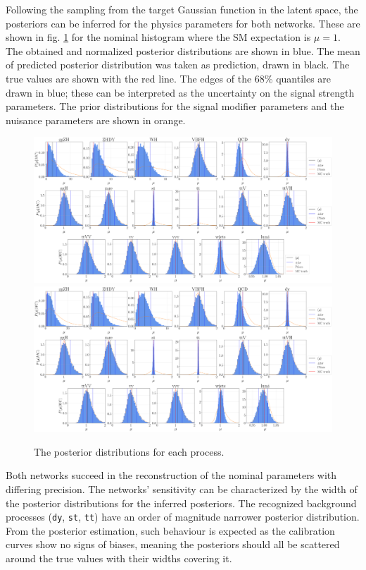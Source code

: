 
Following the sampling from the target Gaussian function in the latent space, the posteriors can be inferred for the physics parameters for both networks. These are shown in fig. \ref{fig:posteriors} for the nominal histogram where the SM expectation is $\mu=1$. The obtained and normalized posterior distributions are shown in blue. The mean of predicted posterior distribution was taken as prediction, drawn in black. The true values are shown with the red line. The edges of the 68\% quantiles are drawn in blue; these can be interpreted as the uncertainty on the signal strength parameters. The prior distributions for the signal modifier parameters and the nuisance parameters are shown in orange.

\begin{figure}[h!]
	\centering
	\includegraphics[width=\linewidth]{figures/inference/finalNoSummarye11000_posteriors}
	\includegraphics[width=\linewidth]{figures/inference/finalSummary1Layer11000e300NodesCdim100_posteriors}
	\caption{The posterior distributions for each process.}
	\label{fig:posteriors}
\end{figure}

Both networks succeed in the reconstruction of the nominal parameters with differing precision. The networks' sensitivity can be characterized by the width of the posterior distributions for the inferred posteriors. The recognized background processes (\texttt{dy}, \texttt{st}, \texttt{tt}) have an order of magnitude narrower posterior distribution. From the posterior estimation, such behaviour is expected as the calibration curves show no signs of biases, meaning the posteriors should all be scattered around the true values with their widths covering it.

